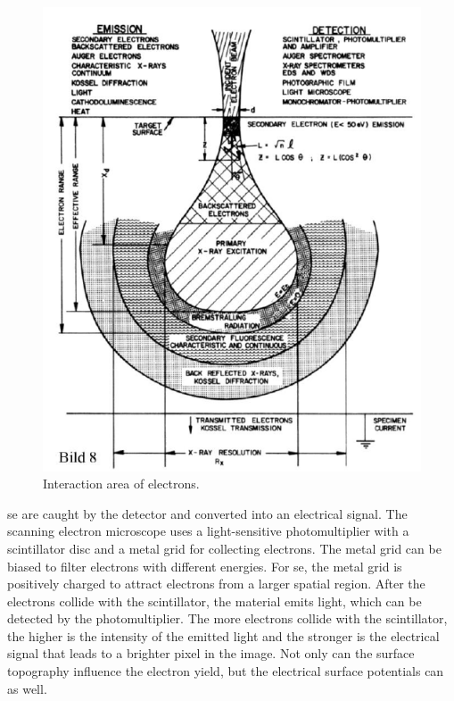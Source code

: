 \begin{figure}[h]
	\centering
	\includegraphics[width=0.95\linewidth]{../assets/birne.png}
	\caption{Interaction area of electrons. }
	\label{fig:birne}
\end{figure}
\ac{se} are caught by the detector and converted into
an electrical signal.
The scanning electron microscope uses a light-sensitive photomultiplier
with a scintillator disc and a metal grid for collecting electrons.
The metal grid can be biased to filter electrons with different energies.
For \ac{se}, the metal grid is positively charged to attract electrons
from a larger spatial region.
After the electrons collide with the scintillator, the material emits
light, which can be detected by the photomultiplier.
The more electrons collide with the scintillator, the higher is the
intensity of the emitted light and the stronger is the
electrical signal that leads to a brighter pixel in the image.
Not only can the surface topography influence the electron yield, but
the electrical surface potentials can as well.

